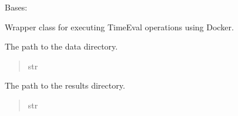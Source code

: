 \documentclass[letterpaper,10pt,english]{sphinxmanual}
\begin{document}
\begin{fulllineitems}
\label{\detokenize{application.services:application.services.TimeEvalWrapper.TimeEvalWrapper}}
\pysigstartsignatures
{}
\pysigstopsignatures
\sphinxAtStartPar
Bases: 

\sphinxAtStartPar
Wrapper class for executing TimeEval operations using Docker.

\begin{fulllineitems}
\label{\detokenize{application.services:application.services.TimeEvalWrapper.TimeEvalWrapper.data_path}}
\pysigstartsignatures
{}
\pysigstopsignatures
\sphinxAtStartPar
The path to the data directory.
\begin{quote}\begin{description}
\sphinxAtStartPar
str

\end{description}\end{quote}

\end{fulllineitems}


\begin{fulllineitems}
\label{\detokenize{application.services:application.services.TimeEvalWrapper.TimeEvalWrapper.results_path}}
\pysigstartsignatures
{}
\pysigstopsignatures
\sphinxAtStartPar
The path to the results directory.
\begin{quote}\begin{description}
\sphinxAtStartPar
str

\end{description}\end{quote}


\end{fulllineitems}
\end{fulllineitems}
\end{document}

